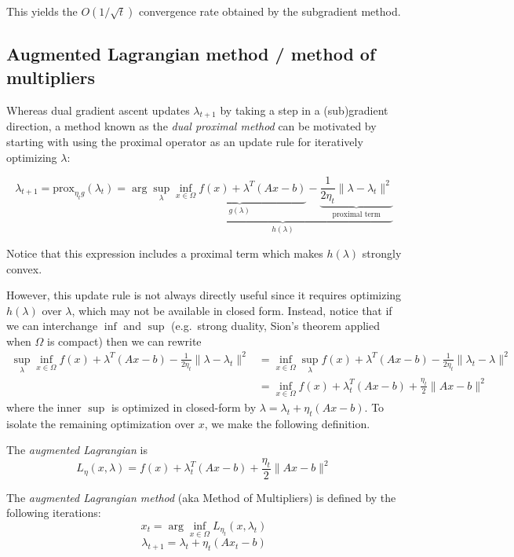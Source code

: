 This yields the $O(1/\sqrt{t})$ convergence rate obtained by the
subgradient method.

\subsection{Augmented Lagrangian method / method of multipliers}

Whereas dual gradient ascent updates $\lambda_{t+1}$ by taking a step
in a (sub)gradient direction, a method known as the \emph{dual proximal
method} can be motivated by starting with using the proximal operator \cite{parikh2014proximal}
as an update rule for iteratively optimizing $\lambda$:

\[
\lambda_{t+1}
= \mathrm{prox}_{\eta_t g}(\lambda_t)
 = \arg\sup_{\lambda} \underbrace{\underbrace{\inf_{x \in \Omega} f(x) + \lambda^T (A x - b)}_{g(\lambda)} - \underbrace{\frac{1}{2 \eta_t} \|\lambda - \lambda_t\|^2}_{\text{proximal term}}}_{h(\lambda)}
\]

Notice that this expression includes a proximal term which makes
$h(\lambda)$ strongly convex.

However, this update rule is not always directly useful since it requires
optimizing $h(\lambda)$ over $\lambda$, which may not be available
in closed form. Instead, notice that if we can interchange $\inf$ and
$\sup$ (e.g.~strong duality, Sion's theorem applied when $\Omega$ is
compact) then we can rewrite
\begin{align*}
\sup_{\lambda} \inf_{x \in \Omega} f(x) + \lambda^T(A x - b) - \frac{1}{2 \eta_t} \|\lambda - \lambda_t\|^2 &= \inf_{x \in \Omega} \sup_\lambda f(x) + \lambda^T(A x - b) - \frac{1}{2\eta_t} \|\lambda_t - \lambda\|^2 \\
&= \inf_{x \in \Omega} f(x) + \lambda_t^T (A x - b) + \frac{\eta_t}{2}\|A x - b\|^2
\end{align*}
where the inner $\sup$ is optimized in closed-form by
$\lambda = \lambda_t + \eta_t(A x - b)$. To isolate the remaining
optimization over $x$, we make the following definition.

\begin{definition}
The \emph{augmented Lagrangian} is
\[L_\eta(x,\lambda) = f(x) + \lambda_t^T (A x - b) + \frac{\eta_t}{2}\|A x - b\|^2\]
\end{definition}

The \emph{augmented Lagrangian method} (aka Method of Multipliers) is
defined by the following iterations:
\[
x_t = \arg\inf_{x \in \Omega} L_{\eta_t} (x, \lambda_t)
\]
\[
\lambda_{t+1} = \lambda_t + \eta_t (A x_t - b)
\]

